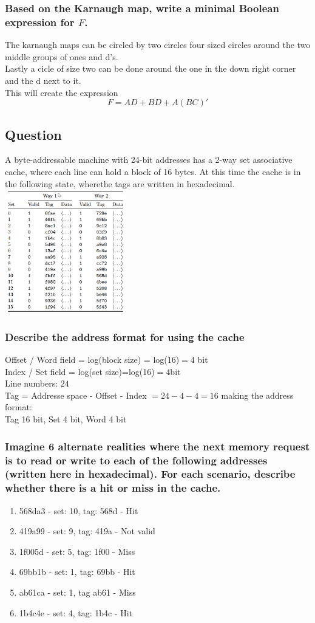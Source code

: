 \documentclass[12pt, a4paper]{article}
\begin{document}
			\subsubsection{Based on the Karnaugh map, write a minimal Boolean expression for $F$.}
				The karnaugh maps can be circled by two circles four sized circles around the two middle groups of ones and d's.\\
				Lastly a cicle of size two can be done around the one in the down right corner and the d next to it.\\
				This will create the expression
				$$F=AD+BD+A(BC)'$$
		\subsection{Question}
			A byte-addressable machine with 24-bit addresses has a 2-way set associative cache, where each line can hold a block of 16 bytes. At this time the cache is in the following state, wherethe tags are written in hexadecimal.\\
			\includegraphics[width=200px]{assets/3.png}
			\subsubsection{Describe the address format for using the cache}
				Offset / Word field = log(block size) = log(16)$=4$ bit\\
				Index / Set field = log(set size)=log(16)$=4$bit\\
				Line numbers: $24$\\
				Tag = Addresse space - Offset - Index $= 24-4-4=16$
				making the address format:\\
				Tag 16 bit, Set 4 bit, Word 4 bit
			\subsubsection{Imagine 6 alternate realities where the next memory request is to read or write to each of the following addresses (written here in hexadecimal). For each scenario, describe whether there is a hit or miss in the cache.}
				\begin{enumerate}
					\item 568da3 - set: 10, tag: 568d - Hit
					\item 419a99 - set: 9, tag: 419a - Not valid
					\item 1f005d - set: 5, tag: 1f00 - Miss
					\item 69bb1b - set: 1, tag: 69bb - Hit
					\item ab61ca - set: 1, tag ab61 - Miss
					\item 1b4c4e - set: 4, tag: 1b4c - Hit
				\end{enumerate}
\end{document}
